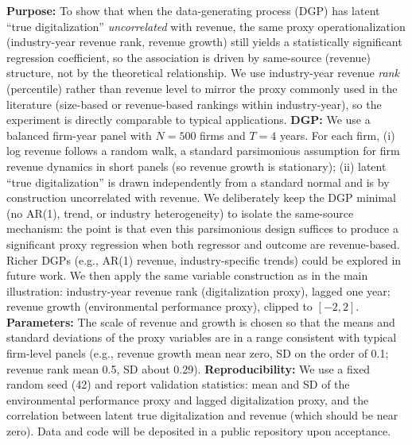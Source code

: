 \textbf{Purpose:} To show that when the data-generating process (DGP) has latent ``true digitalization'' \emph{uncorrelated} with revenue, the same proxy operationalization (industry-year revenue rank, revenue growth) still yields a statistically significant regression coefficient, so the association is driven by same-source (revenue) structure, not by the theoretical relationship. We use industry-year revenue \emph{rank} (percentile) rather than revenue level to mirror the proxy commonly used in the literature (size-based or revenue-based rankings within industry-year), so the experiment is directly comparable to typical applications. \textbf{DGP:} We use a balanced firm-year panel with $N = 500$ firms and $T = 4$ years. For each firm, (i) log revenue follows a random walk, a standard parsimonious assumption for firm revenue dynamics in short panels (so revenue growth is stationary); (ii) latent ``true digitalization'' is drawn independently from a standard normal and is by construction uncorrelated with revenue. We deliberately keep the DGP minimal (no AR(1), trend, or industry heterogeneity) to isolate the same-source mechanism: the point is that even this parsimonious design suffices to produce a significant proxy regression when both regressor and outcome are revenue-based. Richer DGPs (e.g., AR(1) revenue, industry-specific trends) could be explored in future work. We then apply the same variable construction as in the main illustration: industry-year revenue rank (digitalization proxy), lagged one year; revenue growth (environmental performance proxy), clipped to $[-2, 2]$. \textbf{Parameters:} The scale of revenue and growth is chosen so that the means and standard deviations of the proxy variables are in a range consistent with typical firm-level panels (e.g., revenue growth mean near zero, SD on the order of 0.1; revenue rank mean 0.5, SD about 0.29). \textbf{Reproducibility:} We use a fixed random seed (42) and report validation statistics: mean and SD of the environmental performance proxy and lagged digitalization proxy, and the correlation between latent true digitalization and revenue (which should be near zero). Data and code will be deposited in a public repository upon acceptance.
